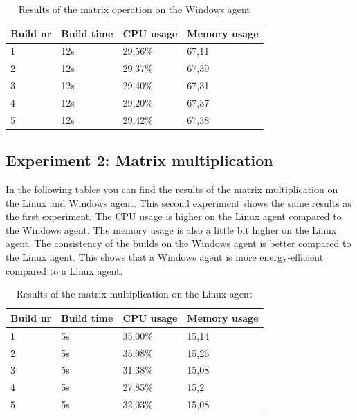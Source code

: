 \begin{table}[H]
\centering
\begin{tabular}{|l|l|l|l|}
\hline
Build nr & Build time & CPU usage & Memory usage \\ \hline
1        & 12s        & 29,56\%   & 67,11       \\ \hline
2        & 12s        & 29,37\%   & 67,39       \\ \hline
3        & 12s        & 29,40\%   & 67,31       \\ \hline
4        & 12s        & 29,20\%   & 67,37       \\ \hline
5        & 12s        & 29,42\%   & 67,38       \\ \hline
\end{tabular}
\caption{Results of the matrix operation on the Windows agent}
\end{table}

\subsection{Experiment 2: Matrix multiplication}
In the following tables you can find the results of the matrix multiplication on the Linux and Windows agent. This second experiment shows the same results as the first experiment. The CPU usage is higher on the Linux agent compared to the Windows agent. The memory usage is also a little bit higher on the Linux agent. The consistency of the builds on the Windows agent is better compared to the Linux agent. This shows that a Windows agent is more energy-efficient compared to a Linux agent.
\begin{table}[H]
\centering
\begin{tabular}{|l|l|l|l|}
\hline
Build nr & Build time & CPU usage & Memory usage \\ \hline
1        & 5s         & 35,00\%   & 15,14       \\ \hline
2        & 5s         & 35,98\%   & 15,26       \\ \hline
3        & 5s         & 31,38\%   & 15,08       \\ \hline
4        & 5s         & 27,85\%   & 15,2        \\ \hline
5        & 5s         & 32,03\%   & 15,08       \\ \hline
\end{tabular}
\caption{Results of the matrix multiplication on the Linux agent}
\end{table}

